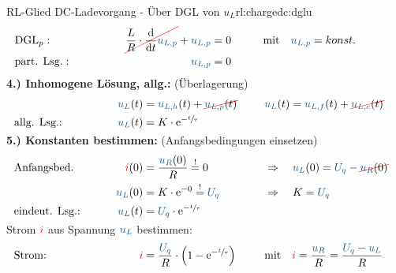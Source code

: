 {\begin{bsp}{RL-Glied DC-Ladevorgang - Über DGL von $u_L$}{rl:chargedc:dglu}
    \begin{align*}%
        &\text{DGL}_{p}:&&&
            \redcancel{\frac{L}{R} \cdot \frac{\mathrm{d}}{\mathrm{d}t} \ecv{u_{L,p}}} + \ecv{u_{L,p}} &= 0 &&&
                &\text{mit}\quad \ecv{u_{L,p}} = konst.  \\
        &\text{part. Lsg.}:&&&
            \ecv{u_{L,p}} &= 0
            \\[-15pt]&\hphantom{R1ooooooo}&&&\hphantom{L3oooooooooooooooooooo}&\hphantom{R3ooo}&&&&\hphantom{R5oooooooooooooooooooooo}\nonumber%
        \end{align*}%
    \textbf{4.) Inhomogene Lösung, allg.:} (Überlagerung)%
    \begin{align*}%
        &&&&
            \ecv{u_L}(t) &= \ecv{u_{L,h}}(t) + \redcancel{\ecv{u_{L,p}}(t)} &&&
            &\ecv{u_L}(t)= \ecv{u_{L,f}}(t) + \redcancel{\ecv{u_{L,e}}(t)}  \\
        &\text{allg. Lsg.:}&&&
            \ecv{u_L}(t) &= K \cdot \mathrm{e}^{-\sfrac{t}{\tau}}
        \\[-15pt]&\hphantom{R1oooooooooooo}&&&\hphantom{L3ooo}&\hphantom{R3oooooooooooooooo}&&&&\hphantom{R5oooooooooooooooooooooo}\nonumber%
    \end{align*}%
    \textbf{5.) Konstanten bestimmen:} (Anfangsbedingungen einsetzen)%
    \begin{align*}%
        &\text{Anfangsbed.}&&&
            \eci{i}(0) &= \frac{\ecv{u_R}(0)}{R} \overset{!}{=} 0 &&&
            &\Rightarrow\quad \ecv{u_L}(0) = \ecv{U_q} - \redcancel{\ecv{u_R}(0)}\\
        &&&&
            \ecv{u_L}(0) &= K \cdot \mathrm{e}^{-0} \overset{!}{=} \ecv{U_q} &&&
            &\Rightarrow\quad K = \ecv{U_q}\\
        &\text{eindeut. Lsg.:}&&&
            \ecv{u_L}(t) &= \ecv{U_q} \cdot \mathrm{e}^{-\sfrac{t}{\tau}}
        \\[-15pt]&\hphantom{R1oooooooooooo}&&&\hphantom{L3ooo}&\hphantom{R3oooooooooooooooo}&&&&\hphantom{R5oooooooooooooooooooooo}\nonumber%
        \end{align*}%
    Strom ${\color{red}i}$ aus Spannung $\ecv{u_L}$ bestimmen:%
    \begin{align*}%
        &\text{Strom:}&&&
            \eci{i} &= \frac{\ecv{U_q}}{R} \cdot \left( 1 - \mathrm{e}^{-\sfrac{t}{\tau}} \right) &&&
            &\text{mit}\quad \eci{i} = \frac{\ecv{u_R}}{R} = \frac{\ecv{U_q} - \ecv{u_L}}{R}
        \\[-15pt]&\hphantom{R1oooooooooooo}&&&\hphantom{L3ooo}&\hphantom{R3oooooooooooooooo}&&&&\hphantom{R5oooooooooooooooooooooo}\nonumber%
    \end{align*}
    \endgroup
\end{bsp}
}%

